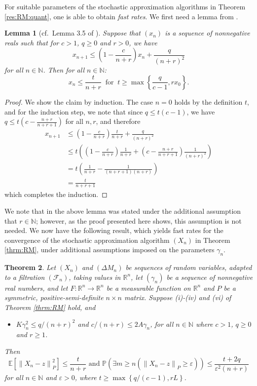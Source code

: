 \documentclass[12pt]{amsart}
\newtheorem{theorem}{Theorem}[section]
\newtheorem{lemma}[theorem]{Lemma}
\theoremstyle{definition}
\theoremstyle{remark}
\newcommand{\norm}[1]{\left\lVert#1\right\rVert}
\newcommand{\NN}{\mathbb{N}}
\newcommand{\RR}{\mathbb{R}}
\newcommand{\PP}{\mathbb{P}}
\newcommand{\EE}{\mathbb{E}}
\begin{document}
For suitable parameters of the stochastic approximation algorithms in Theorem \ref{res:RM:quant}, one is able to obtain \emph{fast rates}. We first need a lemma from \cite{NeriPischkePowell:fejer:rates}.
\begin{lemma}[cf.\ Lemma 3.5 of \cite{NeriPischkePowell:fejer:rates}]
\label{lem:ssLikeForQM}
Suppose that $(x_n)$ is a sequence of nonnegative reals such that for $c>1$, $q\geq 0$ and $r>0$, we have
\[
x_{n+1}\leq \left(1-\frac{c}{n+r}\right)x_n+\frac{q}{(n+r)^2}
\]
for all $n\in\NN$. Then for all $n\in\NN$:
\[
x_n\leq \frac{t}{n+r} \ \text{ for }\ t\geq \max\left\{\frac{q}{c-1},rx_0\right\}.
\]
\end{lemma}

\begin{proof}
We show the claim by induction. The case $n=0$ holds by the definition $t$, and for the induction step, we note that since $q\leq t(c-1)$, we have $q\leq t\left(c-\frac{n+r}{n+r+1}\right)$ for all $n,r$, and therefore
\begin{align*}
x_{n+1}&\leq \left(1-\frac{c}{n+r}\right)\frac{t}{n+r}+\frac{q}{(n+r)^2}\\
&\leq t\left(\left(1-\frac{c}{n+r}\right)\frac{1}{n+r}+\left(c-\frac{n+r}{n+r+1}\right)\frac{1}{(n+r)^2}\right)\\
&=t\left(\frac{1}{n+r}-\frac{1}{(n+r+1)(n+r)}\right)\\
&=\frac{t}{n+r+1}
\end{align*}
which completes the induction.
\end{proof}
We note that in \cite{NeriPischkePowell:fejer:rates} the above lemma was stated under the additional assumption that  $r\in \NN$; however, as the proof presented here shows, this assumption is not needed. We now have the following result, which yields fast rates for the convergence of the stochastic approximation algorithm $(X_n)$ in Theorem \ref{thrm:RM}, under additional assumptions imposed on the parameters $\gamma_n$.
\begin{theorem}
\label{res:RM:quant:fast}
Let $(X_n)$ and $(\Delta M_n)$ be  sequences of random variables, adapted to a filtration $(\mathcal{F}_n)$, taking values in $\RR^n$, let $(\gamma_n)$ be a sequence of nonnegative real numbers, and let $F: \RR^n \to \RR^n$ be a measurable function on $\RR^n$ and $P$ be a symmetric, positive-semi-definite $n \times n$ matrix. Suppose (i)-(iv) and (vi) of Theorem \ref{thrm:RM} hold, and 
\begin{itemize}
    \item [(v'')] $K\gamma_n^2\leq q/(n+r)^2$ and $c/(n+r)\leq 2A\gamma_n$, for all $n\in\mathbb{N}$ where $c>1$, $q\geq 0$ and $r\ge1$.
\end{itemize}
 Then
\[
\EE[\norm{X_n-z}_P^2]\leq\frac{t}{n+r} \text{ and }\PP\left(\exists m\geq n(\norm{X_n-z}_P\geq \varepsilon)\right)\leq \frac{t+2q}{\varepsilon^2(n+r)}
\]
for all $n\in\mathbb{N}$ and $\varepsilon>0$, where $t\geq \max\left\{q/(c-1),rL\right\}$.
\end{theorem}
\end{document}
